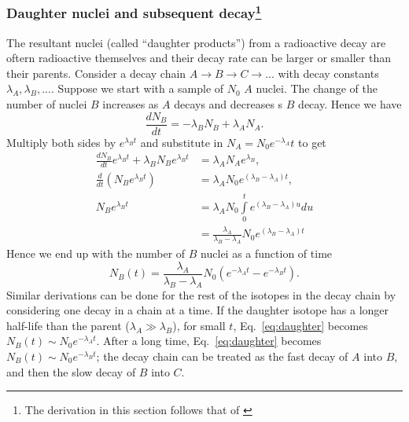 \documentclass[nofootinbib,preprint,aps]{revtex4-1}
\begin{document}
        \subsubsection{Daughter nuclei and subsequent decay\footnote{The derivation in this section follows that of
        \cite[chapt. 1.5]{l01}}}
        The resultant nuclei (called ``daughter products'') from a radioactive decay are oftern radioactive
        themselves and their decay rate can be larger or smaller than their parents. Consider a decay chain
        $A\rightarrow B \rightarrow C \rightarrow ...$ with decay constants $\lambda_A, \lambda_B,...$. Suppose
        we start with a sample of $N_0$ $A$ nuclei. The change of the number of nuclei $B$ increases as $A$
        decays and decreases s $B$ decay. Hence we have
        \begin{equation}
            \frac{dN_B}{dt} = -\lambda_B N_B + \lambda_A N_A.
        \end{equation}
        Multiply both sides by $e^{\lambda_B t}$ and substitute in $N_A=N_0 e^{-\lambda_A} t$ to get
        \begin{align*}
            \frac{dN_B}{dt}e^{\lambda_B t} + \lambda_B N_B e^{\lambda_B t} &= \lambda_A N_A e^{\lambda_B},\nonumber\\
            \frac{d}{dt} (N_B e^{\lambda_B t}) &= \lambda_A N_0 e^{(\lambda_B-\lambda_A)t}, \nonumber\\
            N_B e^{\lambda_B t} &= \lambda_A N_0 \int\limits_0^t e^{(\lambda_B - \lambda_A)u} du \nonumber\\
                                &= \frac{\lambda_A}{\lambda_B-\lambda_A}N_0 e^{(\lambda_B - \lambda_A)t}
        \end{align*}
        Hence we end up with the number of $B$ nuclei as a function of time
        \begin{equation}
            N_B(t)=\frac{\lambda_A}{\lambda_B-\lambda_A}N_0(e^{-\lambda_A t} - e^{-\lambda_B t}).
            \label{eq:daughter}
        \end{equation}
        Similar derivations can be done for the rest of the isotopes in the decay chain by considering
        one decay in a chain at a time. If the daughter isotope has a longer half-life than the parent
        ($\lambda_A \gg \lambda_B$), for small $t$, Eq.~\ref{eq:daughter} becomes
        $N_B(t)\sim N_0 e^{-\lambda_A t}$. After a long time,
        Eq.~\ref{eq:daughter} becomes $N_B(t) \sim N_0 e^{-\lambda_B t}$; the decay
        chain can be treated as the fast decay of $A$ into $B$, and then the slow decay of $B$
        into $C$.
        
\end{document}
